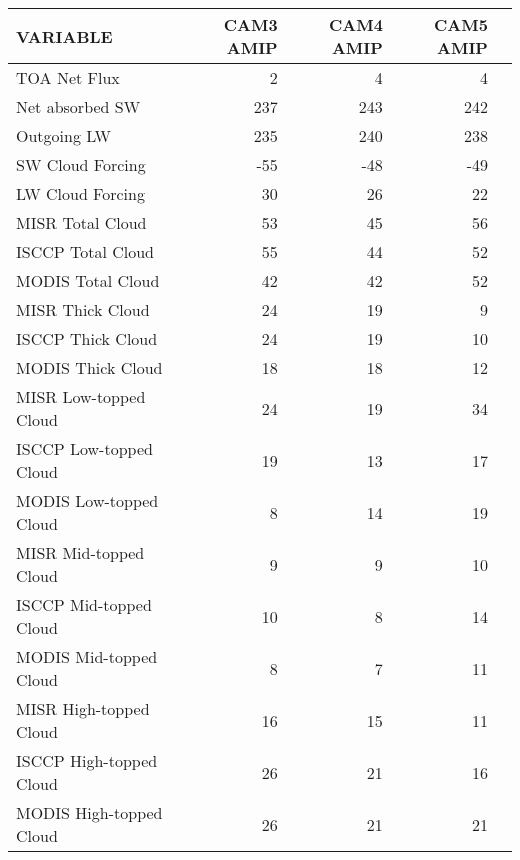 \begin{tabular}{lrrrr}
\hline
                VARIABLE &                CAM3 AMIP &                CAM4 AMIP &                CAM5 AMIP \\ \hline
            TOA Net Flux &                        2 &                        4 &                        4 \\
         Net absorbed SW &                      237 &                      243 &                      242 \\
             Outgoing LW &                      235 &                      240 &                      238 \\
        SW Cloud Forcing &                      -55 &                      -48 &                      -49 \\
        LW Cloud Forcing &                       30 &                       26 &                       22 \\
        MISR Total Cloud &                       53 &                       45 &                       56 \\
       ISCCP Total Cloud &                       55 &                       44 &                       52 \\
       MODIS Total Cloud &                       42 &                       42 &                       52 \\
        MISR Thick Cloud &                       24 &                       19 &                        9 \\
       ISCCP Thick Cloud &                       24 &                       19 &                       10 \\
       MODIS Thick Cloud &                       18 &                       18 &                       12 \\
   MISR Low-topped Cloud &                       24 &                       19 &                       34 \\
  ISCCP Low-topped Cloud &                       19 &                       13 &                       17 \\
  MODIS Low-topped Cloud &                        8 &                       14 &                       19 \\
   MISR Mid-topped Cloud &                        9 &                        9 &                       10 \\
  ISCCP Mid-topped Cloud &                       10 &                        8 &                       14 \\
  MODIS Mid-topped Cloud &                        8 &                        7 &                       11 \\
  MISR High-topped Cloud &                       16 &                       15 &                       11 \\
 ISCCP High-topped Cloud &                       26 &                       21 &                       16 \\
 MODIS High-topped Cloud &                       26 &                       21 &                       21 \\ \hline
\end{tabular}
